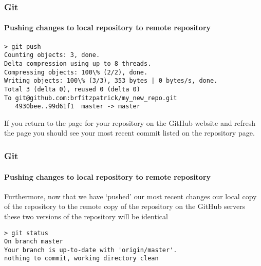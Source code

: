 \documentclass[xcolor=dvipsnames]{beamer}
\begin{document}
\begin{frame}[fragile]
\frametitle{Git}
\framesubtitle{Pushing changes to local repository to remote repository}
\begin{block}{}
\begin{lstlisting}
> git push
Counting objects: 3, done.
Delta compression using up to 8 threads.
Compressing objects: 100\% (2/2), done.
Writing objects: 100\% (3/3), 353 bytes | 0 bytes/s, done.
Total 3 (delta 0), reused 0 (delta 0)
To git@github.com:brfitzpatrick/my_new_repo.git
   4930bee..99d61f1  master -> master
\end{lstlisting}
\end{block}
If you return to the page for your repository on the GitHub website and refresh the page you should see your most recent commit listed on the repository page.
\end{frame}

\begin{frame}[fragile]
\frametitle{Git}
\framesubtitle{Pushing changes to local repository to remote repository}
Furthermore, now that we have `pushed' our most recent changes our local copy of the repository to the remote copy of the repository on the GitHub servers these two versions of the repository will be identical
\newline
\begin{block}{}
\begin{lstlisting}
> git status
On branch master
Your branch is up-to-date with 'origin/master'.
nothing to commit, working directory clean
\end{lstlisting}
\end{block}
\end{frame}


\end{document}
